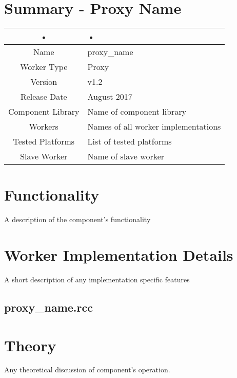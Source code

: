 \documentclass{article}
\author{} %
\date{Version \docVersion} %
\title{\docTitle}
\def\docVersion{1.2}
\def\comp{proxy\_name}
\def\Comp{Proxy Name}
\begin{document}
\section*{Summary - \Comp}
\begin{tabular}{|c|M{13.5cm}|}
	\hline
	•               & •                                 \\
	\hline
	Name              & \comp                               \\
	\hline
	Worker Type       & Proxy                               \\
	\hline
	Version           & v\docVersion                               \\
	\hline
	Release Date      & August 2017                        \\
	\hline
	Component Library & Name of component library           \\
	\hline
	Workers           & Names of all worker implementations \\
	\hline
	Tested Platforms  & List of tested platforms            \\
	\hline
	Slave Worker      & Name of slave worker                \\
	\hline
\end{tabular}

\section*{Functionality}
\begin{flushleft}
	A description of the component's functionality
\end{flushleft}

\section*{Worker Implementation Details}
\begin{flushleft}
	A short description of any implementation specific features
	\subsection*{\comp.rcc}
\end{flushleft}

\section*{Theory}
\begin{flushleft}
	Any theoretical discussion of component's operation.
\end{flushleft}
\end{document}
